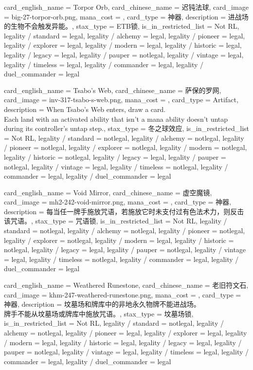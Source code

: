 \documentclass[lang = cn, color = black, 10pt]{AllThatStax}
\begin{document}
\card
{
	card_english_name = {Torpor Orb},
	card_chinese_name = {迟钝法球},
	card_image = big-27-torpor-orb.png,
	mana_cost = ,
	card_type = 神器,
	description = {进战场的生物不会触发异能。},
	stax_type = ETB锁,
	is_in_restricted_list = Not RL,
	legality / standard = legal,
	legality / alchemy = legal,
	legality / pioneer = legal,
	legality / explorer = legal,
	legality / modern = legal,
	legality / historic = legal,
	legality / legacy = legal,
	legality / pauper = notlegal,
	legality / vintage = legal,
	legality / timeless = legal,
	legality / commander = legal,
	legality / duel_commander = legal
}

\card
{
	card_english_name = {Tsabo's Web},
	card_chinese_name = {萨保的罗网},
	card_image = inv-317-tsabo-s-web.png,
	mana_cost = ,
	card_type = Artifact,
	description = {When Tsabo's Web enters, draw a card.\\
		Each land with an activated ability that isn't a mana ability doesn't untap during its controller's untap step.},
	stax_type = 冬之球效应,
	is_in_restricted_list = Not RL,
	legality / standard = notlegal,
	legality / alchemy = notlegal,
	legality / pioneer = notlegal,
	legality / explorer = notlegal,
	legality / modern = notlegal,
	legality / historic = notlegal,
	legality / legacy = legal,
	legality / pauper = notlegal,
	legality / vintage = legal,
	legality / timeless = notlegal,
	legality / commander = legal,
	legality / duel_commander = legal
}

\card
{
	card_english_name = {Void Mirror},
	card_chinese_name = {虚空魔镜},
	card_image = mh2-242-void-mirror.png,
	mana_cost = ,
	card_type = 神器,
	description = {每当任一牌手施放咒语，若施放它时未支付过有色法术力，则反击该咒语。},
	stax_type = 咒语锁,
	is_in_restricted_list = Not RL,
	legality / standard = notlegal,
	legality / alchemy = notlegal,
	legality / pioneer = notlegal,
	legality / explorer = notlegal,
	legality / modern = legal,
	legality / historic = notlegal,
	legality / legacy = legal,
	legality / pauper = notlegal,
	legality / vintage = legal,
	legality / timeless = notlegal,
	legality / commander = legal,
	legality / duel_commander = legal
}

\card
{
	card_english_name = {Weathered Runestone},
	card_chinese_name = {老旧符文石},
	card_image = khm-247-weathered-runestone.png,
	mana_cost = ,
	card_type = 神器,
	description = {坟墓场和牌库中的非地永久物牌不能进战场。\\
		牌手不能从坟墓场或牌库中施放咒语。},
	stax_type = 坟墓场锁,
	is_in_restricted_list = Not RL,
	legality / standard = notlegal,
	legality / alchemy = notlegal,
	legality / pioneer = legal,
	legality / explorer = legal,
	legality / modern = legal,
	legality / historic = legal,
	legality / legacy = legal,
	legality / pauper = notlegal,
	legality / vintage = legal,
	legality / timeless = legal,
	legality / commander = legal,
	legality / duel_commander = legal
}
\end{document}
